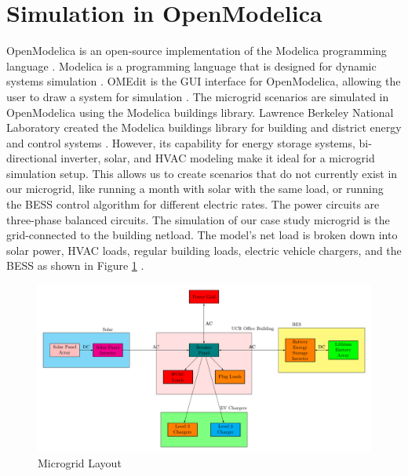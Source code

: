 \documentclass[conference]{IEEEtran}
\begin{document}
\section{Simulation in OpenModelica}
    	OpenModelica is an open-source implementation of the Modelica programming language \cite{OpenModelica}. Modelica is a programming language that is designed for dynamic systems simulation \cite{ModelicaLanguage}. OMEdit is the GUI interface for OpenModelica, allowing the user to draw a system for simulation \cite{OMEdit}. The microgrid scenarios are simulated in OpenModelica using the Modelica buildings library.  Lawrence Berkeley National Laboratory created the Modelica buildings library for building and district energy and control systems \cite{ModelicaBuildingsLibrary}. However, its capability for energy storage systems, bi-directional inverter, solar, and HVAC modeling make it ideal for a microgrid simulation setup. This allows us to create scenarios that do not currently exist in our microgrid, like running a month with solar with the same load, or running the BESS control algorithm for different electric rates.  The power circuits are three-phase balanced circuits. The simulation of our case study microgrid is the grid-connected to the building netload. The model's net load is broken down into solar power, HVAC loads, regular building loads, electric vehicle chargers, and the BESS as shown in Figure \ref{fig:powersystemsetupfull} . 
	\begin{figure}[H]
		\centering
		\includegraphics[width=1\linewidth]{Fig/power_system_setup_modelica}
		\caption{Microgrid Layout}
		\label{fig:powersystemsetupfull}
	\end{figure}
\end{document}
